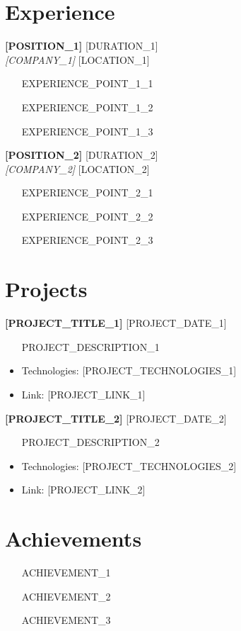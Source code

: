 \documentclass[11pt,a4paper]{article}
\newcommand{\resumeentry}[4]{
    \textbf{#1} \hfill #2 \\
    \textit{#3} \hfill #4 \\
    \vspace{0.1cm}
}
\newcommand{\resumesubentry}[2]{
    \textbf{#1} \hfill #2 \\
    \vspace{0.1cm}
}
\begin{document}
\section{Experience}
\resumeentry{[POSITION_1]}{[DURATION_1]}{[COMPANY_1]}{[LOCATION_1]}
\begin{itemize}[leftmargin=0.2in]
    \item [EXPERIENCE_POINT_1_1]
    \item [EXPERIENCE_POINT_1_2]
    \item [EXPERIENCE_POINT_1_3]
\end{itemize}

\resumeentry{[POSITION_2]}{[DURATION_2]}{[COMPANY_2]}{[LOCATION_2]}
\begin{itemize}[leftmargin=0.2in]
    \item [EXPERIENCE_POINT_2_1]
    \item [EXPERIENCE_POINT_2_2]
    \item [EXPERIENCE_POINT_2_3]
\end{itemize}

\section{Projects}
\resumesubentry{[PROJECT_TITLE_1]}{[PROJECT_DATE_1]}
\begin{itemize}[leftmargin=0.2in]
    \item [PROJECT_DESCRIPTION_1]
    \item Technologies: [PROJECT_TECHNOLOGIES_1]
    \item Link: [PROJECT_LINK_1]
\end{itemize}

\resumesubentry{[PROJECT_TITLE_2]}{[PROJECT_DATE_2]}
\begin{itemize}[leftmargin=0.2in]
    \item [PROJECT_DESCRIPTION_2]
    \item Technologies: [PROJECT_TECHNOLOGIES_2]
    \item Link: [PROJECT_LINK_2]
\end{itemize}

\section{Achievements}
\begin{itemize}[leftmargin=0.2in]
    \item [ACHIEVEMENT_1]
    \item [ACHIEVEMENT_2]
    \item [ACHIEVEMENT_3]
\end{itemize}
\end{document}
